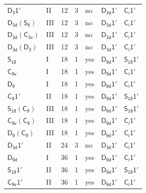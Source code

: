 \documentclass[10pt,a4paper]{article}
\numberwithin{equation}{section}
\newcommand{\grp}[1]{\mathsf{#1}}
\begin{document}
{\begin{longtable}{@{}llrrlll@{}}
\href{D3-1p.pdf}{$\grp{D_{3}1'}$} & II & 12 & 3 & no & \href{D3d-1p.pdf}{$\grp{D_{3d}1'}$} & \href{S2-1p.pdf}{$\grp{C_{i}1'}$}\\
\href{D3d-S6.pdf}{$\grp{D_{3d}}(\grp{S_{6}})$} & III & 12 & 3 & no & \href{D3d-1p.pdf}{$\grp{D_{3d}1'}$} & \href{S2-1p.pdf}{$\grp{C_{i}1'}$}\\
\href{D3d-C3v.pdf}{$\grp{D_{3d}}(\grp{C_{3v}})$} & III & 12 & 3 & no & \href{D3d-1p.pdf}{$\grp{D_{3d}1'}$} & \href{S2-1p.pdf}{$\grp{C_{i}1'}$}\\
\href{D3d-D3.pdf}{$\grp{D_{3d}}(\grp{D_{3}})$} & III & 12 & 3 & no & \href{D3d-1p.pdf}{$\grp{D_{3d}1'}$} & \href{S2-1p.pdf}{$\grp{C_{i}1'}$}\\
\href{../../../rotation/data/pdf/S18.pdf}{$\grp{S_{18}}$} & I & 18 & 1 & yes & \href{D9d-1p.pdf}{$\grp{D_{9d}1'}$} & \href{S18-1p.pdf}{$\grp{S_{18}1'}$}\\
\href{../../../rotation/data/pdf/C9v.pdf}{$\grp{C_{9v}}$} & I & 18 & 1 & yes & \href{D9d-1p.pdf}{$\grp{D_{9d}1'}$} & \href{S2-1p.pdf}{$\grp{C_{i}1'}$}\\
\href{../../../rotation/data/pdf/D9.pdf}{$\grp{D_{9}}$} & I & 18 & 1 & yes & \href{D9d-1p.pdf}{$\grp{D_{9d}1'}$} & \href{S2-1p.pdf}{$\grp{C_{i}1'}$}\\
\href{C9-1p.pdf}{$\grp{C_{9}1'}$} & II & 18 & 1 & yes & \href{D9d-1p.pdf}{$\grp{D_{9d}1'}$} & \href{S18-1p.pdf}{$\grp{S_{18}1'}$}\\
\href{S18-C9.pdf}{$\grp{S_{18}}(\grp{C_{9}})$} & III & 18 & 1 & yes & \href{D9d-1p.pdf}{$\grp{D_{9d}1'}$} & \href{S18-1p.pdf}{$\grp{S_{18}1'}$}\\
\href{C9v-C9.pdf}{$\grp{C_{9v}}(\grp{C_{9}})$} & III & 18 & 1 & yes & \href{D9d-1p.pdf}{$\grp{D_{9d}1'}$} & \href{S2-1p.pdf}{$\grp{C_{i}1'}$}\\
\href{D9-C9.pdf}{$\grp{D_{9}}(\grp{C_{9}})$} & III & 18 & 1 & yes & \href{D9d-1p.pdf}{$\grp{D_{9d}1'}$} & \href{S2-1p.pdf}{$\grp{C_{i}1'}$}\\
\href{D3d-1p.pdf}{$\grp{D_{3d}1'}$} & II & 24 & 3 & no & \href{D3d-1p.pdf}{$\grp{D_{3d}1'}$} & \href{S2-1p.pdf}{$\grp{C_{i}1'}$}\\
\href{../../../rotation/data/pdf/D9d.pdf}{$\grp{D_{9d}}$} & I & 36 & 1 & yes & \href{D9d-1p.pdf}{$\grp{D_{9d}1'}$} & \href{S2-1p.pdf}{$\grp{C_{i}1'}$}\\
\href{S18-1p.pdf}{$\grp{S_{18}1'}$} & II & 36 & 1 & yes & \href{D9d-1p.pdf}{$\grp{D_{9d}1'}$} & \href{S18-1p.pdf}{$\grp{S_{18}1'}$}\\
\href{C9v-1p.pdf}{$\grp{C_{9v}1'}$} & II & 36 & 1 & yes & \href{D9d-1p.pdf}{$\grp{D_{9d}1'}$} & \href{S2-1p.pdf}{$\grp{C_{i}1'}$}\\

\end{longtable}}
\end{document}
